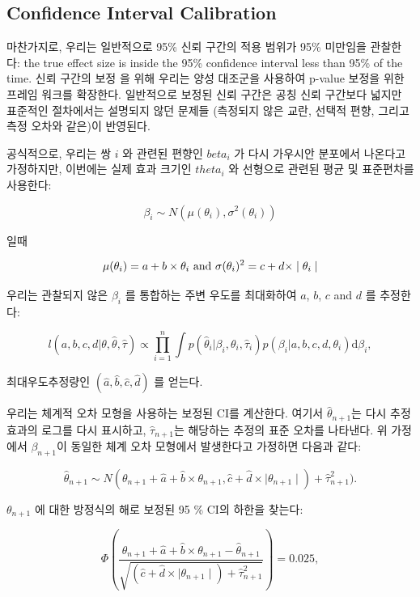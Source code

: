 \documentclass[11pt]{book}
\theoremstyle{definition}
\theoremstyle{definition}
\theoremstyle{definition}
\theoremstyle{remark}
\begin{document}
\subsection{Confidence Interval
Calibration}\label{confidence-interval-calibration}


마찬가지로, 우리는 일반적으로 95\% 신뢰 구간의 적용 범위가 95\% 미만임을
관찰한다: the true effect size is inside the 95\% confidence interval
less than 95\% of the time. 신뢰 구간의 보정 \citep{schuemie_2018} 을
위해 우리는 양성 대조군을 사용하여 p-value 보정을 위한 프레임 워크를
확장한다. 일반적으로 보정된 신뢰 구간은 공칭 신뢰 구간보다 넓지만
표준적인 절차에서는 설명되지 않던 문제들 (측정되지 않은 교란, 선택적
편향, 그리고 측정 오차와 같은)이 반영된다.

공식적으로, 우리는 쌍 \(i\) 와 관련된 편향인 \(beta_i\) 가 다시 가우시안
분포에서 나온다고 가정하지만, 이번에는 실제 효과 크기인 \(theta_i\) 와
선형으로 관련된 평균 및 표준편차를 사용한다:

\[\beta_i \sim N(\mu(\theta_i) , \sigma^2(\theta_i))\]

일때

\[\mu(\theta_i) = a + b \times \theta_i \text{ and } \\
  \sigma(\theta_i) ^2= c + d \times \mid \theta_i \mid\]

우리는 관찰되지 않은 \(\beta_i\) 를 통합하는 주변 우도를 최대화하여
\(a\), \(b\), \(c\) and \(d\) 를 추정한다:

\[l(a,b,c,d | \theta, \hat{\theta}, \hat{\tau} ) \propto \prod_{i=1}^{n}\int p(\hat{\theta}_i|\beta_i, \theta_i, \hat{\tau}_i)p(\beta_i|a,b,c,d,\theta_i) \text{d}\beta_i ,\]

최대우도추정량인 \((\hat{a}, \hat{b}, \hat{c}, \hat{d})\) 를 얻는다.

우리는 체계적 오차 모형을 사용하는 보정된 CI를 계산한다. 여기서
\(\hat{\theta}_{n+1}\)는 다시 추정 효과의 로그를 다시 표시하고,
\(\hat{\tau}_{n+1}\)는 해당하는 추정의 표준 오차를 나타낸다. 위 가정에서
\(\beta_{n+1}\)이 동일한 체계 오차 모형에서 발생한다고 가정하면 다음과
같다:

\[\hat{\theta}_{n+1} \sim N(
\theta_{n+1} + \hat{a} + \hat{b} \times \theta_{n+1},
\hat{c} + \hat{d} \times \mid \theta_{n+1} \mid) + \hat{\tau}_{n+1}^2) .\]

\(\theta_{n+1}\) 에 대한 방정식의 해로 보정된 95 \% CI의 하한을 찾는다:

\[\Phi\left(
\frac{\theta_{n+1} + \hat{a} + \hat{b} \times \theta_{n+1}-\hat{\theta}_{n+1}}
{\sqrt{(\hat{c} + \hat{d} \times \mid \theta_{n+1} \mid) + \hat{\tau}_{n+1}^2}}
\right) = 0.025 ,\]
\end{document}
